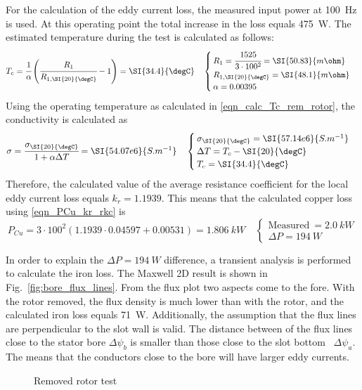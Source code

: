 For the calculation of the eddy current loss, the measured input power at \SI{100}{Hz} is used. At this operating point the total increase in the loss equals \SI{475}{W}. The estimated temperature during the test is calculated as follows:
\begin{equation}
  \label{eqn_calc_Tc_rem_rotor}
  T_c = \cfrac{1}{\alpha}\left(\cfrac{R_1}{R_{1,\SI{20}{\degC}}}-1\right)=%
  \SI{34.4}{\degC}
  \quad
  \begin{cases}
  R_1 = \cfrac{1525}{3\cdot 100^2}=\SI{50.83}{m\ohm} \\
  R_{1,\SI{20}{\degC}}=\SI{48.1}{m\ohm} \\
  \alpha = 0.00395
  \end{cases}
\end{equation}
Using the operating temperature as calculated in \eqref{eqn_calc_Tc_rem_rotor}, the conductivity is calculated as
\begin{equation}
  \sigma = \cfrac{\sigma_{\SI{20}{\degC}}}{1+\alpha \Delta T}=\SI{54.07e6}{S.m^{-1}}
  \quad
  \begin{cases}
  \sigma_{\SI{20}{\degC}} = \SI{57.14e6}{S.m^{-1}} \\
  \Delta T = T_c-\SI{20}{\degC} \\
  T_c = \SI{34.4}{\degC}
  \end{cases}
\end{equation}
Therefore, the calculated value of the average resistance coefficient for the local eddy current loss equals $k_r=1.1939$. This means that the calculated copper loss using \eqref{eqn_PCu_kr_rkc} is
\begin{equation}
  P_{Cu}=3\cdot 100^{2}(1.1939\cdot 0.04597 + 0.00531)=\SI{1.806}{kW}
  \quad
  \begin{cases}
  \mbox{Measured}\:=\SI{2.0}{kW} \\
  \Delta P = \SI{194}{W}
  \end{cases}
\end{equation}

In order to explain the $\Delta P=\SI{194}{W}$ difference, a transient analysis is performed to calculate the iron loss. The Maxwell 2D result is shown in Fig.~\ref{fig:bore_flux_lines}. From the flux plot two aspects come to the fore. With the rotor removed, the flux density is much lower than with the rotor, and the calculated iron loss equals \SI{71}{W}. Additionally, the assumption that the flux lines are perpendicular to the slot wall is valid. The distance between of the flux lines close to the stator bore $\Delta \psi_b$ is smaller than those close to the slot bottom~%
$\Delta \psi_a$. The means that the conductors close to the bore will have larger eddy currents.
\begin{figure}[htbp]
  \centering
  
  \vspace{0.2cm}
  
  \caption{Removed rotor test}
  \label{fig:Main_removed_rotor}
\end{figure}

